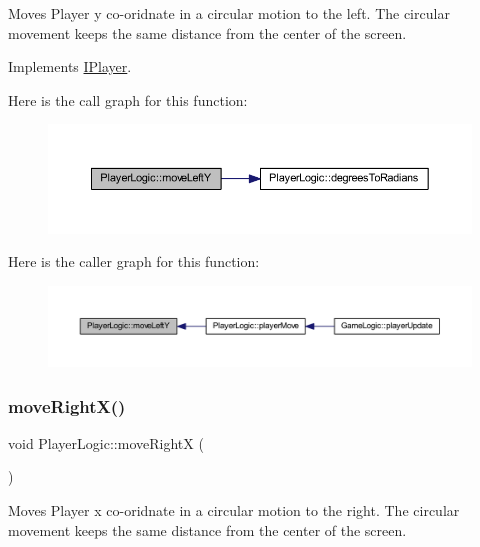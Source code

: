 Moves Player y co-\/oridnate in a circular motion to the left. The circular movement keeps the same distance from the center of the screen. 



Implements \hyperlink{class_i_player_ab4a195d99869ef7628e923e433fc8264}{I\+Player}.

Here is the call graph for this function\+:
\nopagebreak
\begin{figure}[H]
\begin{center}
\leavevmode
\includegraphics[width=350pt]{class_player_logic_a006a7633ae5839d307bb90099f9d2745_cgraph}
\end{center}
\end{figure}
Here is the caller graph for this function\+:
\nopagebreak
\begin{figure}[H]
\begin{center}
\leavevmode
\includegraphics[width=350pt]{class_player_logic_a006a7633ae5839d307bb90099f9d2745_icgraph}
\end{center}
\end{figure}
\mbox{\label{class_player_logic_a9c96291506bb5347f2c503bba4100fd4}} 
\subsubsection{\texorpdfstring{move\+Right\+X()}{moveRightX()}}
{\footnotesize\ttfamily void Player\+Logic\+::move\+RightX (\begin{DoxyParamCaption}{ }\end{DoxyParamCaption})\hspace{0.3cm}{\ttfamily [virtual]}}



Moves Player x co-\/oridnate in a circular motion to the right. The circular movement keeps the same distance from the center of the screen. 



